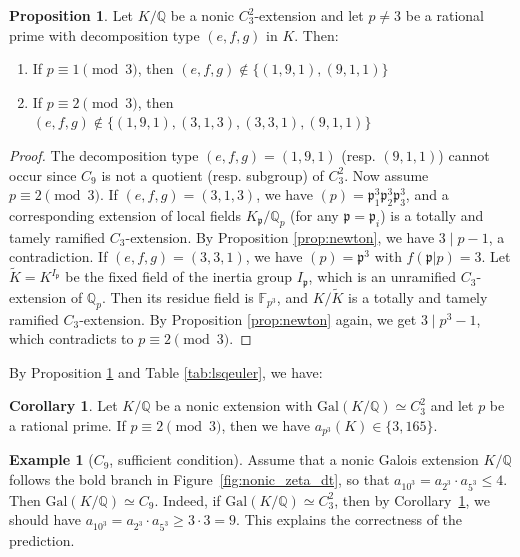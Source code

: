 \documentclass[letterpaper, 10pt]{article}
\newcommand{\Gal}{\mathrm{Gal}}
\newcommand{\bF}{\mathbb{F}}
\newcommand{\bQ}{\mathbb{Q}}
\newcommand{\frp}{\mathfrak{p}}
\newcommand{\1}{\mathds{1}}	%
\theoremstyle{definition}
\newtheorem{proposition}[theorem]{Proposition}
\newtheorem{corollary}[theorem]{Corollary}
\newtheorem{example}[theorem]{Example}
\theoremstyle{remark}
\begin{document}
\begin{proposition}
    \label{prop:C3C3ram}
    Let $K / \bQ$ be a nonic $C_3^2$-extension and let $p \ne 3$ be a rational prime with decomposition type $(e, f, g)$ in $K$. Then: 
    \begin{enumerate}
        \item If $p \equiv 1 \pmod{3}$, then $(e, f, g) \not \in \{(1, 9, 1), (9, 1, 1)\}$
        \item If $p \equiv 2 \pmod{3}$, then $(e, f, g) \not \in \{(1, 9, 1), (3, 1, 3), (3, 3, 1), (9, 1, 1)\}$
    \end{enumerate}
\end{proposition}
\begin{proof}
The decomposition type    $(e, f, g) = (1, 9, 1)$ (resp. $(9, 1, 1)$) cannot occur since $C_9$ is not a quotient (resp. subgroup) of $C_3^2$.
    Now assume $p \equiv 2 \pmod{3}$.
    If $(e, f, g) = (3, 1, 3)$, we have $(p) = \frp_1^3 \frp_2^3 \frp_3^3$, and a corresponding extension of local fields $K_\frp / \bQ_p$ (for any $\frp = \frp_i$) is a totally and tamely ramified $C_3$-extension.
    By Proposition \ref{prop:newton}, we have $3 \mid p - 1$, a contradiction.
    If $(e, f, g) = (3, 3, 1)$, we have $(p) = \frp^3$ with $f(\frp|p) = 3$.
    Let $\tilde K = K^{I_\frp}$ be the fixed field of the inertia group $I_\frp$, which is an unramified $C_3$-extension of $\bQ_p$.
    Then its residue field is $\bF_{p^3}$, and $K / \tilde K$ is a totally and tamely ramified $C_3$-extension.
    By Proposition \ref{prop:newton} again, we get $3 \mid p^3 - 1$, which contradicts to $p \equiv 2 \pmod{3}$.
\end{proof}

By Proposition \ref{prop:C3C3ram} and Table \ref{tab:lsqeuler}, we have:
\begin{corollary}
    \label{cor:C3C3zc}
    Let $K / \bQ$ be a nonic extension with $\Gal(K / \bQ) \simeq C_3^2$ and let $p$ be a rational prime.
    If $p \equiv 2 \pmod{3}$, then we have $a_{p^3}(K) \in \{3, 165\}$.
\end{corollary}

\begin{example}[$C_9$, sufficient condition]
    \label{ex:C9_1000}
    Assume that a nonic Galois extension \( K / \mathbb{Q} \) follows the bold branch in Figure~\ref{fig:nonic_zeta_dt}, so that \( a_{10^3} = a_{2^3} \cdot a_{5^3} \le  4 \).  
Then \( \Gal(K / \mathbb{Q}) \simeq C_9 \).  
Indeed, if \( \Gal(K / \mathbb{Q}) \simeq C_3^2 \), then by Corollary~\ref{cor:C3C3zc}, we should have
\(
a_{10^3} = a_{2^3} \cdot a_{5^3} \ge 3 \cdot 3 = 9.
\)
This explains the correctness of the prediction.  

\end{example}
\end{document}
